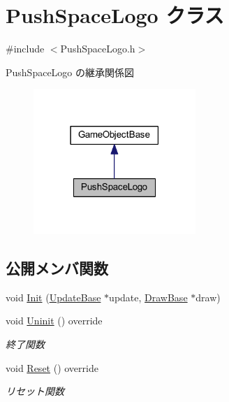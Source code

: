 \hypertarget{class_push_space_logo}{}\section{Push\+Space\+Logo クラス}
\label{class_push_space_logo}


{\ttfamily \#include $<$Push\+Space\+Logo.\+h$>$}



Push\+Space\+Logo の継承関係図\nopagebreak
\begin{figure}[H]
\begin{center}
\leavevmode
\includegraphics[width=174pt]{class_push_space_logo__inherit__graph}
\end{center}
\end{figure}
\subsection*{公開メンバ関数}
\begin{DoxyCompactItemize}
\item 
void \mbox{\hyperlink{class_push_space_logo_a381d34d0dfdd493eb46f299d2a2ba858}{Init}} (\mbox{\hyperlink{class_update_base}{Update\+Base}} $\ast$update, \mbox{\hyperlink{class_draw_base}{Draw\+Base}} $\ast$draw)
\item 
void \mbox{\hyperlink{class_push_space_logo_a06404113db417c58941ca7a13bba161e}{Uninit}} () override
\begin{DoxyCompactList}\small\item\em 終了関数 \end{DoxyCompactList}\item 
void \mbox{\hyperlink{class_push_space_logo_afa163b1aff8df494b4f09f378bf983f0}{Reset}} () override
\begin{DoxyCompactList}\small\item\em リセット関数 \end{DoxyCompactList}\end{DoxyCompactItemize}
